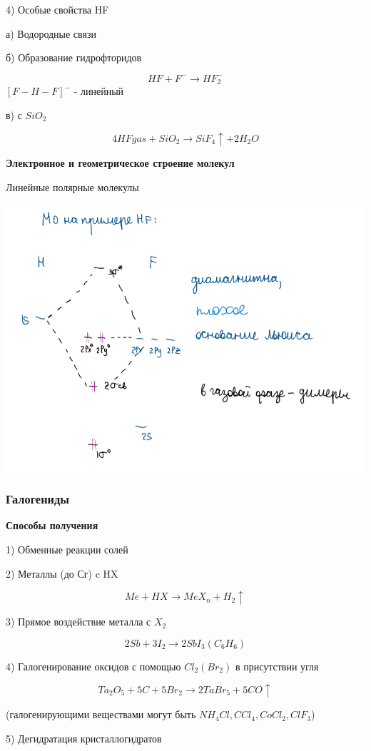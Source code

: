 4) Особые свойства HF

а) Водородные  связи

б) Образование гидрофторидов

$$HF + F^- \rightarrow HF_2^-$$
$[F-H-F]^-$ - линейный

в) с $SiO_2$

$$4HF{gas} + SiO_2 \rightarrow SiF_4\uparrow + 2H_2O$$

\textbf{Электронное и геометрическое строение молекул}

Линейные полярные молекулы

\includegraphics{images/4v1.png}

\subsubsection*{Галогениды}

\textbf{Способы получения}

1) Обменные реакции солей

2) Металлы (до Сг) c HX

$$Me + HX \rightarrow MeX_n + H_2\uparrow$$

3) Прямое воздействие металла с $X_2$

$$2Sb + 3I_2 \rightarrow 2SbI_3 (C_6H_6)$$

4) Галогенирование оксидов с помощью $Cl_2(Br_2)$ в присутствии угля

$$Ta_2O_5 + 5C + 5Br_2 \rightarrow 2TaBr_5 +5CO \uparrow$$

(галогенирующими веществами могут быть $NH_4Cl, CCl_4, CoCl_2, ClF_3$)

5) Дегидратация кристаллогидратов

